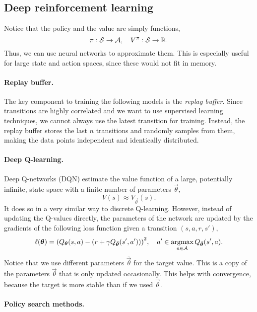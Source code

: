 \subsection{Deep reinforcement learning}

Notice that the policy and the value are simply functions, \[
    \pi: \mathcal{S} \to \mathcal{A}, \quad V^\pi: \mathcal{S} \to \mathbb{R}.
\]
Thus, we can use neural networks to approximate them. This is especially useful for large state and
action spaces, since these would not fit in memory.

\paragraph{Replay buffer.}

The key component to training the following models is the \textit{replay buffer}. Since transitions
are highly correlated and we want to use supervised learning techniques, we cannot always use the
latest transition for training. Instead, the replay buffer stores the last $n$ transitions and
randomly samples from them, making the data points independent and identically distributed.

\paragraph{Deep Q-learning.}

Deep Q-networks (DQN) \citep{mnih2013playing} estimate the value function of a large, potentially
infinite, state space with a finite number of parameters $\vec{\theta}$, \[
    V(s) \approx V_{\vec{\theta}}(s).
\]
It does so in a very similar way to discrete Q-learning. However, instead of updating the Q-values
directly, the parameters of the network are updated by the gradients of the following loss function
given a transition $(s, a, r, s')$, \[
    \ell(\vec{\theta}) = \lft( Q_{\vec{\theta}}(s, a) - (r + \gamma Q_{\bar{\vec{\theta}}}(s',a')) \rgt)^2, \quad a' \in \argmax_{a \in \mathcal{A}} Q_{\bar{\vec{\theta}}}(s', a).
\]
Notice that we use different parameters $\bar{\vec{\theta}}$ for the target value. This is a copy
of the parameters $\vec{\theta}$ that is only updated occasionally. This helps with convergence,
because the target is more stable than if we used $\vec{\theta}$.

\paragraph{Policy search methods.}


